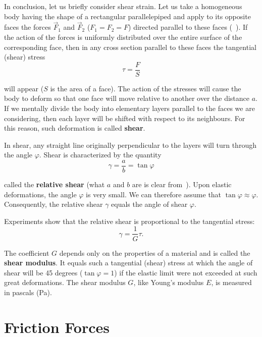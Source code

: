 In conclusion, let us briefly consider shear strain. Let us take a homogeneous body having the shape of a rectangular parallelepiped and apply to its opposite faces the forces $\vec{F}_1$ and $\vec{F}_2$ ($F_1=F_2=F$) directed parallel to these faces (~). If the action of the forces is uniformly distributed over the entire surface of the corresponding face, then in any cross section parallel to these faces the tangential (shear) stress
\begin{equation}\label{eq:2_32}
\tau = \frac{F}{S}
\end{equation}

\noindent
will appear ($S$ is the area of a face). The action of the stresses will cause the body to deform so that one face will move relative to another over the distance $a$. If we mentally divide the body into elementary layers parallel to the faces we are considering, then each layer will be shifted with respect to its neighbours. For this reason, such deformation is called \textbf{shear}.

In shear, any straight line originally perpendicular to the layers will turn through the angle $\varphi$. Shear is characterized by the quantity
\begin{equation}\label{eq:2_33}
\gamma = \frac{a}{b} = \tan\varphi
\end{equation}

\noindent
called the \textbf{relative shear} (what $a$ and $b$ are is clear from~). Upon elastic deformations, the angle $\varphi$ is very small. We can therefore assume that $\tan\varphi\approx\varphi$. Consequently, the relative shear $\gamma$ equals the angle of shear $\varphi$.

Experiments show that the relative shear is proportional to the tangential stress:
\vspace{-12pt}
\begin{equation}\label{eq:2_34}
\gamma = \frac{1}{G}\tau.
\end{equation}

\noindent
The coefficient $G$ depends only on the properties of a material and is called the \textbf{shear modulus}. It equals such a tangential (shear) stress at which the angle of shear will be 45 degrees ($\tan\varphi=1$) if the elastic limit were not exceeded at such great deformations. The shear modulus $G$, like Young's modulus $E$, is measured in pascals (\si{\pascal}).

\section{Friction Forces}\label{sec:2_10}

